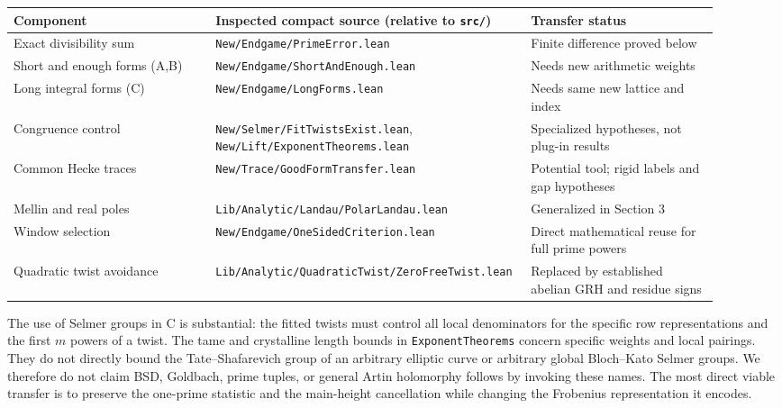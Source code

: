 \documentclass[11pt]{article}
\theoremstyle{definition}\newtheorem{definition}[theorem]{Definition}
\begin{document}
\begin{center}\small
\begin{tabular}{p{0.29\linewidth}p{0.36\linewidth}p{0.26\linewidth}}
\toprule
Component & Inspected compact source (relative to \texttt{src/}) & Transfer status\\\midrule
Exact divisibility sum & \nolinkurl{New/Endgame/PrimeError.lean} & Finite difference proved below\\
Short and enough forms (A,B) & \nolinkurl{New/Endgame/ShortAndEnough.lean} & Needs new arithmetic weights\\
Long integral forms (C) & \nolinkurl{New/Endgame/LongForms.lean} & Needs same new lattice and index\\
Congruence control & \nolinkurl{New/Selmer/FitTwistsExist.lean}, \nolinkurl{New/Lift/ExponentTheorems.lean} & Specialized hypotheses, not plug-in results\\
Common Hecke traces & \nolinkurl{New/Trace/GoodFormTransfer.lean} & Potential tool; rigid labels and gap hypotheses\\
Mellin and real poles & \nolinkurl{Lib/Analytic/Landau/PolarLandau.lean} & Generalized in Section 3\\
Window selection & \nolinkurl{New/Endgame/OneSidedCriterion.lean} & Direct mathematical reuse for full prime powers\\
Quadratic twist avoidance & \nolinkurl{Lib/Analytic/QuadraticTwist/ZeroFreeTwist.lean} & Replaced by established abelian GRH and residue signs\\
\bottomrule
\end{tabular}\end{center}
The use of Selmer groups in C is substantial: the fitted twists must control all local denominators for the specific row representations and the first $m$ powers of a twist. The tame and crystalline length bounds in \texttt{ExponentTheorems} concern specific weights and local pairings. They do not directly bound the Tate--Shafarevich group of an arbitrary elliptic curve or arbitrary global Bloch--Kato Selmer groups. We therefore do not claim BSD, Goldbach, prime tuples, or general Artin holomorphy follows by invoking these names. The most direct viable transfer is to preserve the one-prime statistic and the main-height cancellation while changing the Frobenius representation it encodes.
\end{document}
